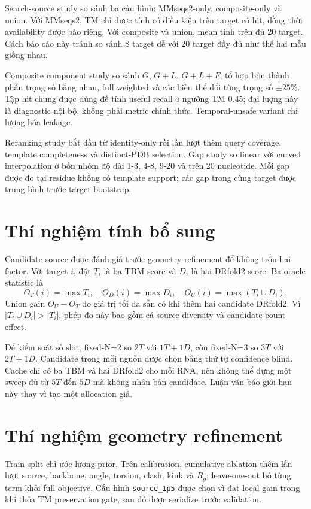 \documentclass[12pt,a4paper,oneside]{report}
\begin{document}
Search-source study so sánh ba cấu hình: MMseqs2-only, composite-only và union. Với
MMseqs2, TM chỉ được tính có điều kiện trên target có hit, đồng thời availability được
báo riêng. Với composite và union, mean tính trên đủ 20 target. Cách báo cáo này tránh
so sánh 8 target dễ với 20 target đầy đủ như thể hai mẫu giống nhau.

Composite component study so sánh $G$, $G+L$, $G+L+F$, tổ hợp bốn thành phần trọng số
bằng nhau, full weighted và các biến thể đổi từng trọng số $\pm25\%$. Tập hit chung được
dùng để tính useful recall ở ngưỡng TM 0.45; đại lượng này là diagnostic nội bộ, không
phải metric chính thức. Temporal-unsafe variant chỉ lượng hóa leakage.

Reranking study bắt đầu từ identity-only rồi lần lượt thêm query coverage, template
completeness và distinct-PDB selection. Gap study so linear với curved interpolation ở
bốn nhóm độ dài 1-3, 4-8, 9-20 và trên 20 nucleotide. Mỗi gap được đo tại residue không
có template support; các gap trong cùng target được trung bình trước target bootstrap.

\section{Thí nghiệm tính bổ sung}

Candidate source được đánh giá trước geometry refinement để không trộn hai factor. Với
target $i$, đặt $T_i$ là ba TBM score và $D_i$ là hai DRfold2 score. Ba oracle statistic
là
\begin{equation}
O_T(i)=\max T_i,\quad O_D(i)=\max D_i,\quad
O_U(i)=\max(T_i\cup D_i).
\end{equation}
Union gain $O_U-O_T$ đo giá trị tối đa sẵn có khi thêm hai candidate DRfold2. Vì
$|T_i\cup D_i|>|T_i|$, phép đo này bao gồm cả source diversity và candidate-count effect.

Để kiểm soát số slot, fixed-N=2 so $2T$ với $1T+1D$, còn fixed-N=3 so $3T$ với
$2T+1D$. Candidate trong mỗi nguồn được chọn bằng thứ tự confidence blind. Cache chỉ có
ba TBM và hai DRfold2 cho mỗi RNA, nên không thể dựng một sweep đủ từ $5T$ đến $5D$ mà
không nhân bản candidate. Luận văn báo giới hạn này thay vì tạo một allocation giả.

\section{Thí nghiệm geometry refinement}

Train split chỉ ước lượng prior. Trên calibration, cumulative ablation thêm lần lượt
source, backbone, angle, torsion, clash, kink và $R_g$; leave-one-out bỏ từng term khỏi
full objective. Cấu hình \texttt{source\_1p5} được chọn vì đạt local gain trong khi thỏa
TM preservation gate, sau đó được serialize trước validation.
\end{document}
